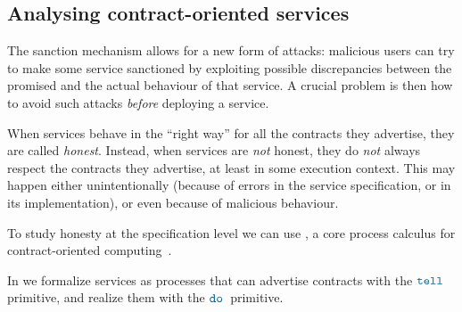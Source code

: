 \subsection*{Analysing contract-oriented services}

The sanction mechanism
allows for a new form of attacks: 
malicious users can try
to make some service sanctioned by exploiting possible discrepancies between
the promised and the actual behaviour of that service. %
A crucial problem is then
how to avoid such attacks \emph{before} deploying a service. %

When services behave in the ``right way'' for all the contracts
they advertise,
they are called \emph{honest}. %
Instead, when services are \emph{not} honest,
they do \emph{not} always respect the contracts they advertise,
at least in some execution context. %
This may happen either unintentionally
(because of errors in the service specification, or in its implementation),
or even because of malicious behaviour.

To study honesty at the specification level we can use \coco, 
a core process calculus for contract-oriented 
computing~\cite{BZ10lics,BTZ12sacs}.

In \coco we formalize services 
as processes that can advertise contracts with the $\tell{}{}$ primitive,
and realize them with the $\fact{}{}$ primitive. %

